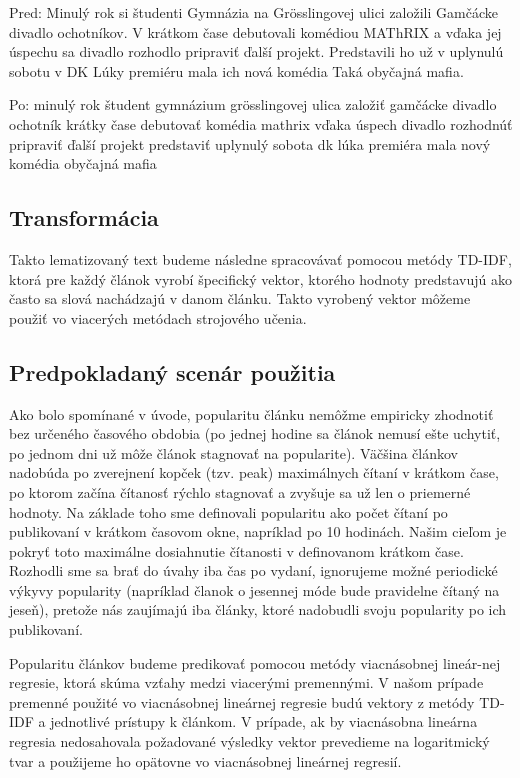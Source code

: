 \documentclass[runningheads,a4paper]{llncs}
\begin{document}
\begin{multicols}{2}
Pred: Minulý rok si študenti Gymnázia na Grösslingovej ulici založili Gamčácke divadlo ochotníkov. V krátkom čase debutovali komédiou MAThRIX a vďaka jej úspechu sa divadlo rozhodlo pripraviť ďalší projekt. Predstavili ho už v uplynulú sobotu v DK Lúky premiéru mala ich nová komédia Taká obyčajná mafia.

Po: minulý rok študent gymnázium grösslingovej ulica založiť gamčácke divadlo ochotník krátky čase debutovať komédia mathrix vďaka úspech divadlo rozhodnúť pripraviť ďalší projekt predstaviť uplynulý sobota dk lúka premiéra mala nový komédia obyčajná mafia
\end{multicols}

\subsection{Transformácia}
Takto lematizovaný text budeme následne spracovávať pomocou metódy TD-IDF, ktorá pre každý článok vyrobí špecifický vektor, ktorého hodnoty predstavujú ako často sa slová nachádzajú v danom článku. Takto vyrobený vektor môžeme použiť vo viacerých metódach strojového učenia.

\subsection{Predpokladaný scenár použitia}
Ako bolo spomínané v úvode, popularitu článku nemôžme empiricky zhodnotiť bez určeného časového obdobia (po jednej hodine sa článok nemusí ešte uchytiť, po jednom dni už môže článok stagnovať na popularite). Väčšina článkov nadobúda po zverejnení kopček (tzv. peak) maximálnych čítaní v krátkom čase, po ktorom začína čítanosť rýchlo stagnovať a zvyšuje sa už len o priemerné hodnoty. Na základe toho sme definovali popularitu ako počet čítaní po publikovaní v krátkom časovom okne, napríklad po 10 hodinách. Našim cieľom je pokryť toto maximálne dosiahnutie čítanosti v definovanom krátkom čase. Rozhodli sme sa brať do úvahy iba čas po vydaní, ignorujeme možné periodické výkyvy popularity (napríklad članok o jesennej móde bude pravidelne čítaný na jeseň), pretože nás zaujímajú iba články, ktoré nadobudli svoju popularity po ich publikovaní.

Popularitu článkov budeme predikovať pomocou metódy viacnásobnej lineár-nej regresie, ktorá skúma vzťahy medzi viacerými premennými. V našom prípade premenné použité vo viacnásobnej lineárnej regresie budú vektory z metódy TD-IDF a jednotlivé prístupy k článkom. V prípade, ak by viacnásobna lineárna regresia nedosahovala požadované výsledky vektor prevedieme na logaritmický tvar a použijeme ho opätovne vo viacnásobnej lineárnej regresií.
\end{document}
